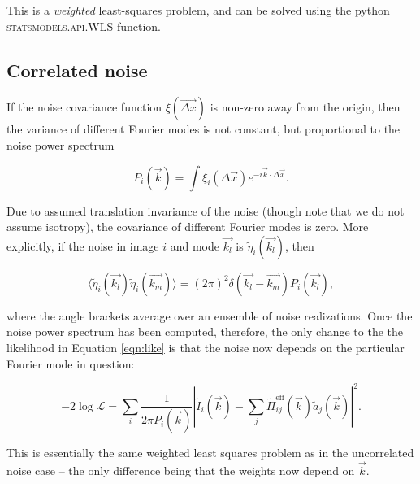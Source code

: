 \documentclass{article}
\begin{document}


This is a \textit{weighted} least-squares problem, and can be solved using the python
\textsc{statsmodels.api.WLS} function.

\subsection{Correlated noise}

If the noise covariance function $\xi(\vec{\Delta x})$ is non-zero away from the origin, then the variance
of different Fourier modes is not constant, but proportional to the noise power spectrum

\begin{equation}
  P_i(\vec{k}) = \int \xi_i(\Delta \vec{x}) e^{-i \vec{k}\cdot\Delta\vec{x}}.
\end{equation}

Due to assumed translation invariance of the noise (though note that we do not assume isotropy), the
covariance of different Fourier modes is zero.  More explicitly, if the noise in image $i$ and mode
$\vec{k_l}$ is $\tilde\eta_i(\vec{k_l})$, then

\begin{equation}
  \langle\tilde\eta_i(\vec{k_l})\tilde\eta_i(\vec{k_m})\rangle = (2 \pi)^2 \delta(\vec{k_l} - \vec{k_m})P_i(\vec{k_l}),
\end{equation}

where the angle brackets average over an ensemble of noise realizations.  Once the noise power
spectrum has been computed, therefore, the only change to the the likelihood in Equation
\ref{eqn:like} is that the noise now depends on the particular Fourier mode in question:

\begin{equation}
    \label{eqn:likecorr}
    -2 \log \mathcal{L} = \sum_i\frac{1}{2 \pi P_i(\vec{k})}\left|\tilde{I}_i(\vec{k}) - \sum_j \tilde{\Pi}^\mathrm{eff}_{ij}(\vec{k}) \tilde{a}_j(\vec{k})\right|^2.
\end{equation}

This is essentially the same weighted least squares problem as in the uncorrelated noise case -- the
only difference being that the weights now depend on $\vec{k}$.
\end{document}
